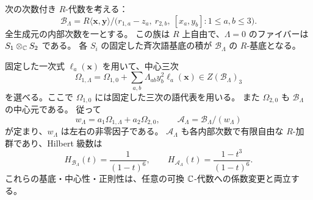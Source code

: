 \begin{theorem}[中心平方を代入した二次族と自由中心商]
\label{ifc:thm:family}
次の次数付き $R$-代数を考える：
\begin{equation}\label{ifc:eq:presentation}
 \mathcal B_\Lambda
 =R\langle\mathbf x,\mathbf y\rangle
   \big/
    \bigl(r_{1,a}-z_a,\ r_{2,b},\
                   [x_a,y_b]:1\le a,b\le3\bigr).
\end{equation}
全生成元の内部次数を一とする。
この族は $R$ 上自由で、$\Lambda=0$ のファイバーは $S_1\otimes_\mathbb C S_2$ である。
各 $S_i$ の固定した斉次語基底の積が $\mathcal B_\Lambda$ の $R$-基底となる。

固定した一次式 $\ell_a(\mathbf x)$ を用いて、中心三次
\begin{equation}\label{ifc:eq:center-lift}
 \Omega_{1,\Lambda}
   =\Omega_{1,0}+\sum_{a,b}\Lambda_{ab}y_b^2\ell_a(\mathbf x)
       \in Z(\mathcal B_\Lambda)_3
\end{equation}
を選べる。ここで $\Omega_{1,0}$ には固定した三次の語代表を用いる。
また $\Omega_{2,0}$ も $\mathcal B_\Lambda$ の中心元である。
従って
\[
 w_\Lambda=a_1\Omega_{1,\Lambda}+a_2\Omega_{2,0},
       \qquad \mathcal A_\Lambda=\mathcal B_\Lambda/(w_\Lambda)
\]
が定まり、$w_\Lambda$ は左右の非零因子である。
$\mathcal A_\Lambda$ も各内部次数で有限自由な $R$-加群であり、Hilbert 級数は
\begin{equation}\label{ifc:eq:hilbert}
 H_{\mathcal B_\Lambda}(t)=\frac1{(1-t)^6},\qquad
 H_{\mathcal A_\Lambda}(t)=\frac{1-t^3}{(1-t)^6}.
\end{equation}
これらの基底・中心性・正則性は、任意の可換 $\mathbb C$-代数への係数変更と両立する。
\end{theorem}

